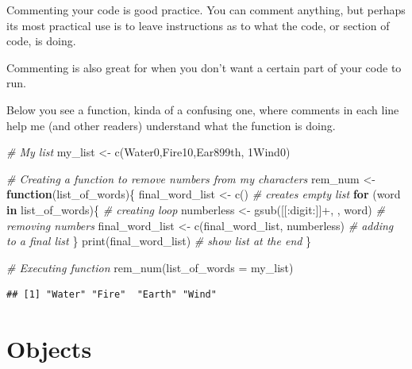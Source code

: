 \documentclass[
]{book}
\newenvironment{Shaded}{\begin{snugshade}}{\end{snugshade}}
\newcommand{\AttributeTok}[1]{\textcolor[rgb]{0.77,0.63,0.00}{#1}}
\newcommand{\CommentTok}[1]{\textcolor[rgb]{0.56,0.35,0.01}{\textit{#1}}}
\newcommand{\ControlFlowTok}[1]{\textcolor[rgb]{0.13,0.29,0.53}{\textbf{#1}}}
\newcommand{\FunctionTok}[1]{\textcolor[rgb]{0.00,0.00,0.00}{#1}}
\newcommand{\NormalTok}[1]{#1}
\newcommand{\OtherTok}[1]{\textcolor[rgb]{0.56,0.35,0.01}{#1}}
\newcommand{\StringTok}[1]{\textcolor[rgb]{0.31,0.60,0.02}{#1}}
\begin{document}
Commenting your code is good practice.
You can comment anything, but perhaps its most practical use is to leave instructions as to what the code, or section of code, is doing.

Commenting is also great for when you don't want a certain part of your code to run.

Below you see a function, kinda of a confusing one, where comments in each line help me (and other readers) understand what the function is doing.

\begin{Shaded}
\begin{Highlighting}[]
\CommentTok{\# My list}
\NormalTok{my\_list }\OtherTok{\textless{}{-}} \FunctionTok{c}\NormalTok{(}\StringTok{\textquotesingle{}Water0\textquotesingle{}}\NormalTok{,}\StringTok{\textquotesingle{}Fire10\textquotesingle{}}\NormalTok{,}\StringTok{\textquotesingle{}Ear899th\textquotesingle{}}\NormalTok{, }\StringTok{\textquotesingle{}1Wind0\textquotesingle{}}\NormalTok{)}

\CommentTok{\# Creating a function to remove numbers from my characters}
\NormalTok{rem\_num }\OtherTok{\textless{}{-}} \ControlFlowTok{function}\NormalTok{(list\_of\_words)\{}
\NormalTok{  final\_word\_list }\OtherTok{\textless{}{-}} \FunctionTok{c}\NormalTok{()  }\CommentTok{\# creates empty list}
  \ControlFlowTok{for}\NormalTok{ (word }\ControlFlowTok{in}\NormalTok{ list\_of\_words)\{  }\CommentTok{\# creating loop}
\NormalTok{    numberless }\OtherTok{\textless{}{-}} \FunctionTok{gsub}\NormalTok{(}\StringTok{\textquotesingle{}[[:digit:]]+\textquotesingle{}}\NormalTok{, }\StringTok{\textquotesingle{}\textquotesingle{}}\NormalTok{, word)  }\CommentTok{\# removing numbers}
\NormalTok{    final\_word\_list }\OtherTok{\textless{}{-}} \FunctionTok{c}\NormalTok{(final\_word\_list, numberless)  }\CommentTok{\# adding to a final list}
\NormalTok{  \}}
  \FunctionTok{print}\NormalTok{(final\_word\_list) }\CommentTok{\# show list at the end}
\NormalTok{\}}

\CommentTok{\# Executing function}
\FunctionTok{rem\_num}\NormalTok{(}\AttributeTok{list\_of\_words =}\NormalTok{ my\_list)}
\end{Highlighting}
\end{Shaded}

\begin{verbatim}
## [1] "Water" "Fire"  "Earth" "Wind"
\end{verbatim}

\hypertarget{objects}{%
\section{Objects}\label{objects}}
\end{document}
